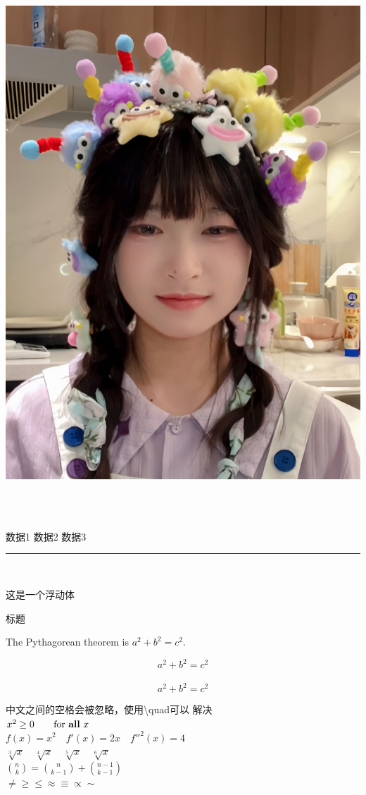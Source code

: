 \documentclass{ctexart}
\begin{document}
\includegraphics[scale = 0.1]{test.jpg}
\par
{} \\
 \\
\raggedright
\begin{minipage}{3em}
    数据1 数据2 数据3
\end{minipage}
\par
\rule{5pt}{8pt}\\

\begin{table}[h]

  这是一个浮动体\caption{标题}

\end{table}

\par 
The Pythagorean theorem is
$a^2 + b^2 = c^2$.

\begin{equation}
    a^2 + b^2 = c^2
\end{equation} \\
\[ a^2 + b^2 = c^2 \] \par
中文之间的空格会被忽略，使用\textbackslash quad可以 \quad 解决 \\

$x^{2} \geq 0 \qquad
\text{for \textbf{all} }
x$ \\
$f(x) = x^2 \quad f'(x) = 2x \quad f''^{2}(x) = 4$ \\
$ \sqrt[3]{x} \quad \sqrt[4]{x} \quad \sqrt[5]{x} \quad \sqrt[6]{x} $\\
$ \binom{n}{k} = \binom{n}{k-1} + \binom{n-1}{k-1} $\\
$ \ne \ge \le \approx \equiv \propto \sim $
\end{document}
